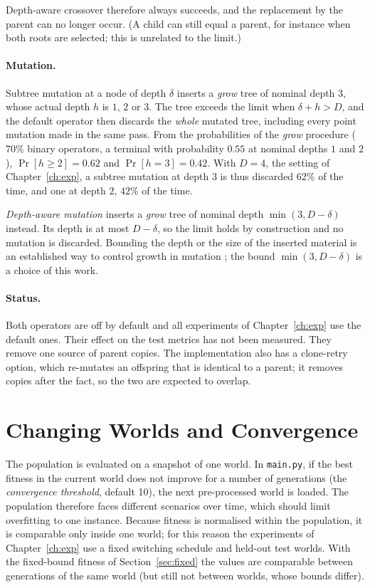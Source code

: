 Depth-aware crossover therefore always succeeds, and the replacement by the
parent can no longer occur. (A child can still equal a parent, for instance when
both roots are selected; this is unrelated to the limit.)

\paragraph{Mutation.} Subtree mutation at a node of depth $\delta$ inserts a
\emph{grow} tree of nominal depth $3$, whose actual depth $h$ is $1$, $2$ or $3$.
The tree exceeds the limit when $\delta+h>D$, and the default operator then
discards the \emph{whole} mutated tree, including every point mutation made in
the same pass. From the probabilities of the \emph{grow} procedure ($70\%$
binary operators, a terminal with probability $0.55$ at nominal depths $1$ and
$2$), $\Pr[h\ge2]=0.62$ and $\Pr[h=3]=0.42$. With $D=4$, the setting of
Chapter~\ref{ch:exp}, a subtree mutation at depth $3$ is thus discarded $62\%$ of
the time, and one at depth $2$, $42\%$ of the time.

\emph{Depth-aware mutation} inserts a \emph{grow} tree of nominal depth
$\min(3,D-\delta)$ instead. Its depth is at most $D-\delta$, so the limit holds by
construction and no mutation is discarded. Bounding the depth or the size of the
inserted material is an established way to control growth in mutation
\citep[Section~11.3.2]{poli2008fieldguide}; the bound $\min(3,D-\delta)$ is a
choice of this work.

\paragraph{Status.} Both operators are off by default and all experiments of
Chapter~\ref{ch:exp} use the default ones. Their effect on the test metrics has
not been measured. They remove one source of parent copies. The implementation
also has a clone-retry option, which re-mutates an offspring that is identical to
a parent; it removes copies after the fact, so the two are expected to overlap.

\section{Changing Worlds and Convergence}
\label{sec:worlds}
The population is evaluated on a snapshot of one world. In \texttt{main.py}, if the best fitness
in the current world does not improve for a number of generations (the \emph{convergence
threshold}, default 10), the next pre-processed world is loaded. The population therefore faces
different scenarios over time, which should limit overfitting to one instance. Because fitness is
normalised within the population, it is comparable only inside one world; for this reason the
experiments of Chapter~\ref{ch:exp} use a fixed switching schedule and held-out test worlds.
With the fixed-bound fitness of Section~\ref{sec:fixed} the values are comparable between
generations of the same world (but still not between worlds, whose bounds differ).
